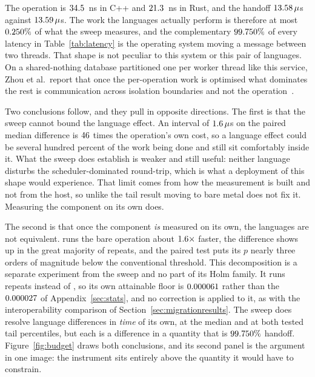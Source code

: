\documentclass[english,oneside,a4paper,censored,csm,software-track-2020]{HYthesisML}
\begin{document}
The operation is $34.5$~ns in C++ and $21.3$~ns in Rust, and the handoff
$13.58\,\mu$s against $13.59\,\mu$s. The work the languages actually
perform is therefore at most $0.250\%$ of what the sweep measures, and the
complementary $99.750\%$ of every latency in Table~\ref{tab:latency} is the
operating system moving a message between two threads. That shape is not peculiar to this system
or this pair of languages. On a shared-nothing database partitioned one per worker thread like
this service, Zhou et al.\ report that once the per-operation work is optimised what dominates the
rest is communication across isolation boundaries and not the operation~\cite{zhou2025oltp}.

Two conclusions follow, and they pull in opposite directions. The first is that the sweep cannot
bound the language effect. An interval of $1.6\,\mu$s on the paired median difference
is $46$ times the operation's own cost, so a language effect could be several
hundred percent of the work being done and still sit comfortably inside it. What the sweep does
establish is weaker and still useful: neither language disturbs the scheduler-dominated
round-trip, which is what a deployment of this shape would experience. That limit comes from how
the measurement is built and not from the host, so unlike the tail result moving to bare metal
does not fix it. Measuring the component on its own does.

The second is that once the component \emph{is} measured on its own, the languages are not
equivalent. \BudgetCoreFaster{} runs the bare operation about $1.6\times$ faster, the
difference shows up in the great majority of repeats, and the paired test puts its $p$ nearly
three orders of magnitude below the conventional threshold. This decomposition is a separate
experiment from the sweep and no part of its Holm family. It runs \BudgetRepeats{} repeats instead
of \NRepeats{}, so its own attainable floor is $0.000061$ rather than the $0.000027$ of
Appendix~\ref{sec:stats}, and no correction is applied to it, as with the interoperability
comparison of Section~\ref{sec:migrationresults}. The sweep does resolve language differences in
\emph{time} of its own, at the median and at both tested tail percentiles, but each is a
difference in a quantity that is $99.750\%$ handoff. Figure~\ref{fig:budget} draws
both conclusions, and its second panel is the argument in one image: the instrument sits entirely
above the quantity it would have to constrain.
\end{document}
